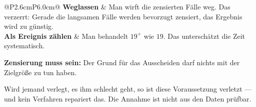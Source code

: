 \begin{warnung}
\begin{center}
\renewcommand{\arraystretch}{1.5}
\begin{tabular}{@{}P{2.6cm}P{6.0cm}@{}}
\toprule
\textbf{Weglassen} & Man wirft die zensierten Fälle weg. Das verzerrt: Gerade die langsamen Fälle werden bevorzugt zensiert, das Ergebnis wird zu günstig.\\
\textbf{Als Ereignis zählen} & Man behandelt $19^+$ wie $19$. Das unterschätzt die Zeit systematisch.\\
\bottomrule
\end{tabular}
\end{center}

\begin{center}
\begin{minipage}{0.88\textwidth}
\end{minipage}
\end{center}

\begin{center}
\begin{minipage}{0.9\textwidth}
\textbf{Zensierung muss  sein:} Der Grund für das Ausscheiden darf nichts mit der Zielgröße zu tun haben.
\end{minipage}
\end{center}

Wird jemand verlegt,  es ihm schlecht geht, so ist diese Voraussetzung verletzt --- und kein Verfahren repariert das. Die Annahme ist nicht aus den Daten prüfbar.
\end{warnung}


